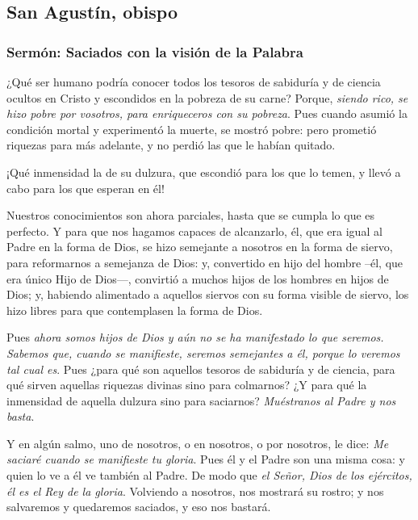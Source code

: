 		\subsection{San Agustín, obispo}
		
			\subsubsection{Sermón: Saciados con la visión de la Palabra}
					
						
				\begin{body}
					¿Qué ser humano podría conocer todos los tesoros de sabiduría y de ciencia ocultos en Cristo y escondidos en la pobreza de su carne? Porque, \emph{siendo rico, se hizo pobre por vosotros, para enriqueceros con su pobreza}. Pues cuando asumió la condición mortal y experimentó la muerte, se mostró pobre: pero prometió riquezas para más adelante, y no perdió las que le habían quitado.
					
					¡Qué inmensidad la de su dulzura, que escondió para los que lo temen, y llevó a cabo para los que esperan en él!
					
					Nuestros conocimientos son ahora parciales, hasta que se cumpla lo que es perfecto. Y para que nos hagamos capaces de alcanzarlo, él, que era igual al Padre en la forma de Dios, se hizo semejante a nosotros en la forma de siervo, para reformarnos a semejanza de Dios: y, convertido en hijo del hombre --él, que era único Hijo de Dios---, convirtió a muchos hijos de los hombres en hijos de Dios; y, habiendo alimentado a aquellos siervos con su forma visible de siervo, los hizo libres para que contemplasen la forma de Dios.
					
					Pues \emph{ahora somos hijos de Dios y aún no se ha manifestado lo que seremos. Sabemos que, cuando se manifieste, seremos semejantes a él, porque lo veremos tal cual es}. Pues ¿para qué son aquellos tesoros de sabiduría y de ciencia, para qué sirven aquellas riquezas divinas sino para colmarnos? ¿Y para qué la inmensidad de aquella dulzura sino para saciarnos? \emph{Muéstranos al Padre y nos basta}.
					
					Y en algún salmo, uno de nosotros, o en nosotros, o por nosotros, le dice: \emph{Me saciaré cuando se manifieste tu gloria}. Pues él y el Padre son una misma cosa: y quien lo ve a él ve también al Padre. De modo que \emph{el Señor, Dios de los ejércitos, él es el Rey de la gloria}. Volviendo a nosotros, nos mostrará su rostro; y nos salvaremos y quedaremos saciados, y eso nos bastará.
					

\end{body}
